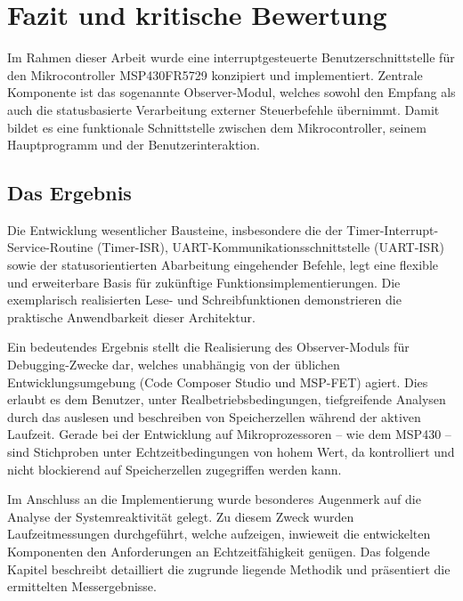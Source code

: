 

\chapter{Fazit und kritische Bewertung}
\label{cha:Fazit}

Im Rahmen dieser Arbeit wurde eine interruptgesteuerte Benutzerschnittstelle f\"ur den Mikrocontroller MSP430FR5729 konzipiert und implementiert. Zentrale Komponente ist das sogenannte Observer-Modul, welches sowohl den Empfang als auch die statusbasierte Verarbeitung externer Steuerbefehle \"ubernimmt. Damit bildet es eine funktionale Schnittstelle zwischen dem Mikrocontroller, seinem Hauptprogramm und der Benutzerinteraktion.


\section{Das Ergebnis}
\label{sec:Ergebnis}

Die Entwicklung wesentlicher Bausteine, insbesondere die der Timer-Interrupt-Service-Routine (Timer-ISR), UART-Kommunikationsschnittstelle (UART-ISR) sowie der statusorientierten Abarbeitung eingehender Befehle, legt eine flexible und erweiterbare Basis f\"ur zuk\"unftige Funktionsimplementierungen. Die exemplarisch realisierten Lese- und Schreibfunktionen demonstrieren die praktische Anwendbarkeit dieser Architektur.

Ein bedeutendes Ergebnis stellt die Realisierung des Observer-Moduls f\"ur Debugging-Zwecke dar, welches unabh\"angig von der \"ublichen Entwicklungsumgebung (Code Composer Studio und MSP-FET) agiert. Dies erlaubt es dem Benutzer, unter Realbetriebsbedingungen, tiefgreifende Analysen durch das auslesen und beschreiben von Speicherzellen w\"ahrend der aktiven Laufzeit. Gerade bei der Entwicklung auf Mikroprozessoren -- wie dem MSP430 -- sind Stichproben unter Echtzeitbedingungen von hohem Wert, da kontrolliert und nicht blockierend auf Speicherzellen zugegriffen werden kann.

\newpage
Im Anschluss an die Implementierung wurde besonderes Augenmerk auf die Analyse der Systemreaktivit\"at gelegt. Zu diesem Zweck wurden Laufzeitmessungen durchgef\"uhrt, welche aufzeigen, inwieweit die entwickelten Komponenten den Anforderungen an Echtzeitf\"ahigkeit gen\"ugen. Das folgende Kapitel beschreibt detailliert die zugrunde liegende Methodik und pr\"asentiert die ermittelten Messergebnisse.\AI



